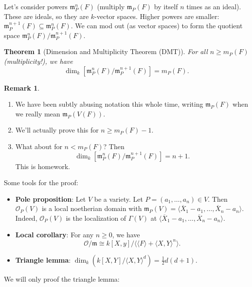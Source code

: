 \documentclass[12pt]{article}
\newcommand{\vbrack}[1]{\langle #1\rangle}
\newtheorem{theorem}{Theorem}[section]
\theoremstyle{definition}
\newtheorem*{remark}{Remark}
\begin{document}
Let's consider powers $\mathfrak{m}_P^n(F)$ (multiply $\mathfrak{m}_P(F)$ by itself $n$ times as an ideal). These are ideals, so they are $k$-vector spaces. Higher powers are smaller: $\mathfrak{m}_P^{n+1}(F)\subseteq \mathfrak{m}_P^n(F)$. We can mod out (as vector spaces) to form the quotient space $\mathfrak{m}_P^n(F)/\mathfrak{m}_P^{n+1}(F)$.
\begin{theorem}[Dimension and Multiplicity Theorem (DMT)]
    For all $n\geq m_P(F)$ (multiplicity!), we have
    \begin{equation}
        \dim_k[\mathfrak{m}_P^n(F)/\mathfrak{m}_P^{n+1}(F)]=m_P(F).
    \end{equation}
\end{theorem}
\begin{remark}
   \begin{enumerate}
       \item We have been subtly abusing notation this whole time, writing $\mathfrak{m}_P(F)$ when we really mean $\mathfrak{m}_P(V(F))$.
       \item We'll actually prove this for $n\geq m_P(F)-1$.
       \item What about for $n<m_P(F)$? Then
       \begin{equation}
           \dim_k[\mathfrak{m}_P^n(F)/\mathfrak{m}_P^{n+1}(F)]=n+1.
       \end{equation}
       This is homework.
   \end{enumerate}
\end{remark}
Some tools for the proof:
\begin{itemize}
    \item \textbf{Pole proposition}: Let $V$ be a variety. Let $P=(a_1,\dotsc,a_n)\in V$. Then $\mathcal{O}_P(V)$ is a local noetherian domain with $\mathfrak{m}_P(V)=\vbrack{\overline{X}_1-a_1,\dotsc,\overline{X}_n-a_n}$. Indeed, $\mathcal{O}_P(V)$ is the localization of $\Gamma(V)$ at $\vbrack{\overline{X}_1-a_1,\dotsc,\overline{X}_n-a_n}$. 
    \item \textbf{Local corollary}: For any $n\geq0$, we have
    \begin{equation}
        \mathcal{O}/\mathfrak{m}\cong k[X,y]/\vbrack{\vbrack{F}+\vbrack{X,Y}^n}.
    \end{equation}
    \item \textbf{Triangle lemma}: $\dim_k(k[X,Y]/\vbrack{X,Y}^d)=\frac{1}{2}d(d+1)$.
\end{itemize}
We will only proof the triangle lemma:
\end{document}
